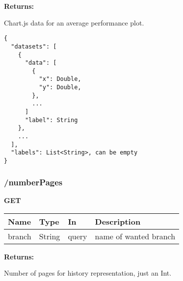 \textbf{Returns: }

Chart.js data for an average performance plot.
\begin{lstlisting}
{
  "datasets": [
    {
      "data": [
        {
          "x": Double,
          "y": Double,
        },
        ...
      ]
      "label": String
    },
    ...
  ],
  "labels": List<String>, can be empty
}
\end{lstlisting}

\subsubsection*{/numberPages}

\textbf{GET}

\begin{tabular}{ l l l l }
  Name & Type & In & Description \\ 
  \hline
  branch & String & query & name of wanted branch \\
  \hline
\end{tabular}

\textbf{Returns: }

Number of pages for history representation, just an Int.
